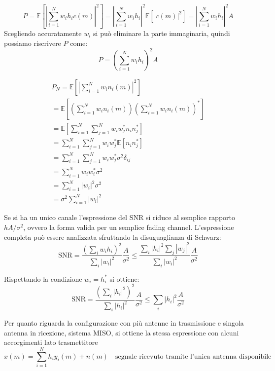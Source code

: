 \[
    P = \mathbb{E} \left[ \left|  \sum_{i=1}^{N} w_i h_i c(m)  \right| ^2  \right] = \left| \sum_{i=1}^{N} w_i h_i \right|^2 \mathbb{E} \left[ \left| c(m)\right|^2  \right] = \left| \sum_{i=1}^{N} w_i h_i \right|^2 A
\]
Scegliendo accuratamente $w_i$ si può eliminare la parte immaginaria, quindi possiamo riscrivere $P$ come:
\[
    P = \left( \sum_{i=1}^{N} w_i h_i \right)^2 A
\]



\[
    \begin{array}{ll}
            P_N = \mathbb{E} \left[ \left| \sum_{i=1}^{N} w_i n_i(m)  \right|^2 \right] \\
            = \mathbb{E} \left[ \left( \sum_{i=1}^{N} w_i n_i(m) \right)  \left( \sum_{i=1}^{N} w_i n_i(m) \right)^*  \right] \\
            = \mathbb{E} \left[  \sum_{i=1}^{N} \sum_{j=1}^{N} w_i w_j^* n_i n_j^*  \right] \\
            = \sum_{i=1}^{N} \sum_{j=1}^{N} w_i w_j^* \mathbb{E} \left[ n_i n_j^* \right] \\
            = \sum_{i=1}^{N} \sum_{j=1}^{N} w_i w_j^* \sigma^2 \delta_{ij} \\
            = \sum_{i=1}^{N} w_i w_i^* \sigma^2 \\
            = \sum_{i=1}^{N} |w_i|^2 \sigma^2 \\
            = \sigma^2 \sum_{i=1}^{N} |w_i|^2 
    \end{array}
\]

Se si ha un unico canale l'espressione del SNR si riduce al semplice rapporto $hA/\sigma^2$, ovvero la forma valida per un semplice fading channel.
L'espressione completa può essere analizzata sfruttando la disuguaglianza di Schwarz:
\[
    \text{SNR} = \frac{\left(\sum_{i} w_i h_i \right)^2}{\sum_{i} |w_i|^2} \frac{A}{\sigma ^2} \leq \frac{\sum_{i} |h_i|^2 \sum_{j} \left| w_j \right|^2}{\sum_{i} |w_i|^2} \frac{A}{\sigma^2}
\]


Rispettando la condizione $w_i = h_i^*$ si ottiene:
\[
    \text{SNR} = \frac{\left(\sum_{i} \left| h_i \right|^2 \right)^2}{\sum_{i} |h_i|^2} \frac{A}{\sigma ^2} \leq \sum_{i} |h_i|^2 \frac{A}{\sigma^2}
\]


Per quanto riguarda la configurazione con più antenne in trasmissione e singola antenna in ricezione, sistema MISO, si ottiene la stessa espressione con alcuni accorgimenti lato trasmettitore
\[
    x(m) = \sum_{i=1}^{N} h_i y_i(m) + n(m) \quad \text{segnale ricevuto tramite l'unica antenna disponibile}
\]


